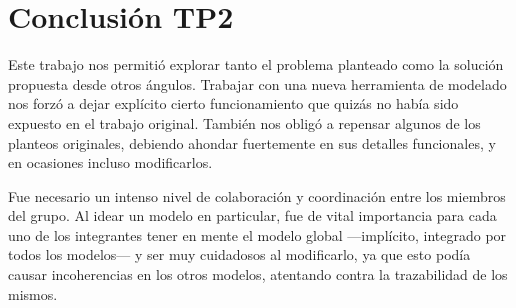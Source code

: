 \section{Conclusión TP2}

Este trabajo nos permitió explorar tanto el problema planteado como la solución propuesta desde otros ángulos. Trabajar con una nueva herramienta de modelado nos forzó a dejar explícito cierto funcionamiento que quizás no había sido expuesto en el trabajo original. También nos obligó a repensar algunos de los planteos originales, debiendo ahondar fuertemente en sus detalles funcionales, y en ocasiones incluso modificarlos.

Fue necesario un intenso nivel de colaboración y coordinación entre los miembros del grupo. Al idear un modelo en particular, fue de vital importancia para cada uno de los integrantes tener en mente el modelo global —implícito, integrado por todos los modelos— y ser muy cuidadosos al modificarlo, ya que esto podía causar incoherencias en los otros modelos, atentando contra la trazabilidad de los mismos.
